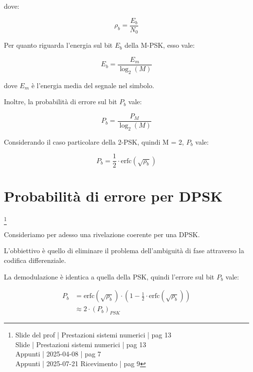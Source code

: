 dove:

{
    \Large 
    \begin{equation}
        \rho_b = \frac{E_b}{N_0}
    \end{equation}
}

Per quanto riguarda l'energia sul bit $E_b$ della M-PSK, esso vale: 

{
    \Large 
    \begin{equation}
        E_b 
        = 
        \frac{E_m}{\log_{2} (M)}
    \end{equation}
}

dove $E_m$ è l'energia media del segnale nel simbolo. \newline 

Inoltre, la probabilità di errore sul bit $P_b$ vale: 

{
    \Large 
    \begin{equation}
        P_b 
        = 
        \frac{P_M}{\log_{2} (M)}
    \end{equation}
}

Considerando il caso particolare della 2-PSK, quindi M = 2, 
$P_b$ vale: 

{
    \Large 
    \begin{equation}
        P_b 
        = 
        \frac{1}{2}
        \cdot
        \text{erfc}
        \left( \sqrt{\rho_b}\right)
    \end{equation}
}

\newpage 

\section{Probabilità di errore per DPSK}
\footnote{Slide del prof | Prestazioni sistemi numerici | pag 13 \\
Slide | Prestazioni sistemi numerici | pag 13 \\
Appunti | 2025-04-08 | pag 7 \\ 
Appunti | 2025-07-21 Ricevimento | pag 9
}

Consideriamo per adesso una rivelazione coerente per una DPSK. \newline 

L'obbiettivo è quello di eliminare il problema dell'ambiguità di fase attraverso la codifica differenziale. \newline 

La demodulazione è identica a quella della PSK, 
quindi l'errore sul bit $P_b$ vale:

{
    \Large 
    \begin{equation}
        \begin{split}
            P_b
            &= 
            \text{erfc} (\sqrt{\rho_b}) 
            \cdot 
            \left(
                1 - \frac{1}{2} \cdot \text{erfc} (\sqrt{\rho_b})
            \right)
            \\
            &\approx
            2 \cdot (P_b)_{PSK}
        \end{split}
    \end{equation}
}

